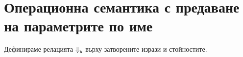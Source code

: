 \section{Операционна семантика с предаване на параметрите по име}

Дефинираме релацията $\Downarrow_{\vv{a}}$ върху затворените изрази и стойностите.

\begin{prooftree}
\end{prooftree}

\begin{prooftree}
\end{prooftree}

\begin{prooftree}
\end{prooftree}


\begin{prooftree}
\end{prooftree}

\begin{prooftree}
\end{prooftree}

\begin{prooftree}
\end{prooftree}

